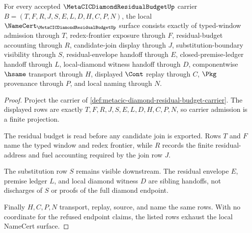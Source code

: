 \begin{theorem}
\label{thm:metacic-diamond-residual-budget-namecert-obligations}
For every accepted $\MetaCICDiamondResidualBudgetUp$ carrier $B=(T,F,R,J,S,E,L,D,H,C,P,N)$, the local $\NameCert_{\MetaCICDiamondResidualBudgetUp}$ surface consists exactly of typed-window admission through $T$, redex-frontier exposure through $F$, residual-budget accounting through $R$, candidate-join display through $J$, substitution-boundary visibility through $S$, residual-envelope handoff through $E$, closed-premise-ledger handoff through $L$, local-diamond witness handoff through $D$, componentwise $\hsame$ transport through $H$, displayed $\Cont$ replay through $C$, $\Pkg$ provenance through $P$, and local naming through $N$.
\end{theorem}
\begin{proof}
Project the carrier of \autoref{def:metacic-diamond-residual-budget-carrier}. The displayed rows are exactly $T,F,R,J,S,E,L,D,H,C,P,N$, so carrier admission is a finite projection.

The residual budget is read before any candidate join is exported. Rows $T$ and $F$ name the typed window and redex frontier, while $R$ records the finite residual-address and fuel accounting required by the join row $J$.

The substitution row $S$ remains visible downstream. The residual envelope $E$, premise ledger $L$, and local diamond witness $D$ are sibling handoffs, not discharges of $S$ or proofs of the full diamond endpoint.

Finally $H,C,P,N$ transport, replay, source, and name the same rows. With no coordinate for the refused endpoint claims, the listed rows exhaust the local NameCert surface.
\end{proof}

